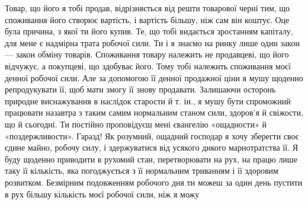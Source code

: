 Товар, що його я тобі продав, відрізняється від решти товарової
черні тим, що споживання його створює вартість, і вартість
більшу, ніж сам він коштує. Оце була причина, з якої ти його
купив. Те, що тобі видається зростанням капіталу, для мене є
надмірна трата робочої сили. Ти і я знаємо на ринку лише один
закон — закон обміну товарів. Споживання товару належить
не продавцеві, що його відчужує, а покупцеві, що здобуває його.
Тому тобі належить споживання моєї денної робочої сили. Але
за допомогою її денної продажної ціни я мушу щоденно репродукувати
її, щоб мати змогу її знову продавати. Залишаючи осторонь
природне виснажування в наслідок старости й т. ін., я мушу
бути спроможний працювати назавтра з таким самим нормальним
станом сили, здоров’я й свіжости, що й сьогодні. Ти постійно
проповідуєш мені євангелію «ощадности» й «поздержливости».
Гаразд! Як розумний, ощадний господар я хочу зберегти своє
єдине майно, робочу силу, і здержуватися від усякого дикого
марнотратства її. Я буду щоденно приводити в рухомий стан,
перетворювати на рух, на працю лише таку її кількість, яка
погоджується з її нормальним триванням і її здоровим розвитком.
Безмірним подовженням робочого дня ти можеш за один день
пустити в рух більшу кількість моєї робочої сили, ніж я можу
\parbreak{}  %
